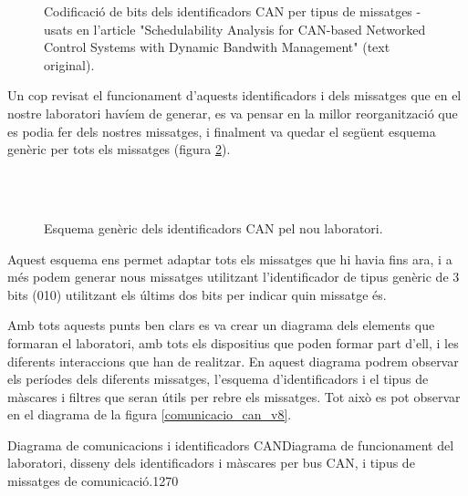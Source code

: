 \begin{figure}[ht!]
    \caption[Codificació de bits dels identificadors CAN per tipus de missatges]{ Codificació de bits dels identificadors CAN per tipus de missatges - usats en l'article "Schedulability Analysis for CAN-based Networked Control Systems with Dynamic Bandwith Management" \cite{SchAnaCANbasNCS} (text original).}
    \label{fig:bit_encoding}

\end{figure}

Un cop revisat el funcionament d'aquests identificadors i dels missatges que en el nostre laboratori havíem de generar, es va pensar en la millor reorganització que es podia fer dels nostres missatges, i finalment va quedar el següent esquema genèric per tots els missatges (figura \ref{fig:bit_encoding:CAN:nou:generic}).

\begin{figure}[ht!]
	\begin{bytefield}[bitwidth=\linewidth/29]{29}
		    \\
	     \\
	       
	\end{bytefield}
    \caption{Esquema genèric dels identificadors CAN pel nou laboratori.}
    \label{fig:bit_encoding:CAN:nou:generic}
\end{figure}

Aquest esquema ens permet adaptar tots els missatges que hi havia fins ara, i a més podem generar nous missatges utilitzant l'identificador de tipus genèric de 3 bits (010) utilitzant els últims dos bits per indicar quin missatge és.

Amb tots aquests punts ben clars es va crear un diagrama dels elements que formaran el laboratori, amb tots els dispositius que poden formar part d'ell, i les diferents interaccions que han de realitzar. En aquest diagrama podrem observar els períodes dels diferents missatges, l'esquema d'identificadors i el tipus de màscares i filtres que seran útils per rebre els missatges. Tot això es pot observar en el diagrama de la figura \ref{comunicacio_can_v8}.

\begin{landscape}
{Diagrama de comunicacions i identificadors CAN}{Diagrama de funcionament del laboratori, disseny dels identificadors i màscares per bus CAN, i tipus de missatges de comunicació.}{1}{270}
\end{landscape}


